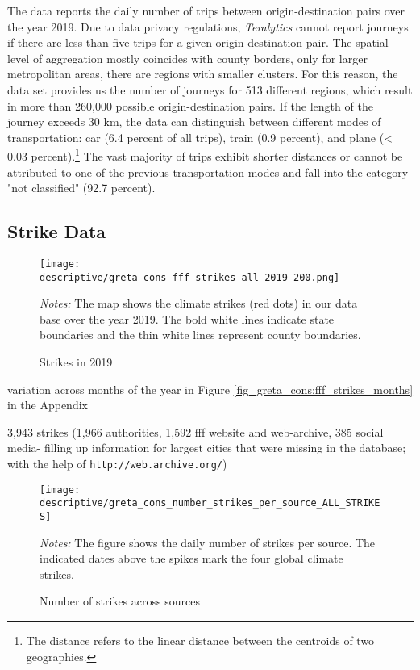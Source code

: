The data reports the daily number of trips between origin-destination pairs over the year 2019. Due to data privacy regulations, \textit{Teralytics} cannot report journeys if there are less than five trips for a given origin-destination pair. The spatial level of aggregation mostly coincides with county borders, only for larger metropolitan areas, there are regions with smaller clusters. For this reason, the data set provides us the number of journeys for 513 different regions, which result in more than 260,000 possible origin-destination pairs. If the length of the journey exceeds 30 km, the data can distinguish between different modes of transportation: car (6.4 percent of all trips), train (0.9 percent), and plane (< 0.03 percent).\footnote{The distance refers to the linear distance between the centroids of two geographies.} The vast majority of trips exhibit shorter distances or cannot be attributed to one of the previous transportation modes and fall into the category "not classified" (92.7 percent).








\subsection{Strike Data}


\begin{figure}[t]\centering
	\caption{Strikes in 2019}\label{fig_greta_cons:fff_strikes_2019}
	\texttt{[image: descriptive/greta\_cons\_fff\_strikes\_all\_2019\_200.png]}
	\begin{minipage}{0.8\linewidth}
		\scriptsize{\emph{Notes:} The map shows the climate strikes (red dots) in our data base over the year 2019. The bold white lines indicate state boundaries and the thin white lines represent county boundaries.}
	\end{minipage}
\end{figure}

variation across months of the year in Figure \ref{fig_greta_cons:fff_strikes_months} in the Appendix


3,943 strikes (1,966 authorities, 1,592 fff website and web-archive, 385 social media- filling up information for largest cities that were missing in the database; with the help of \texttt{http://web.archive.org/})

\begin{figure}[t]\centering
	\caption{Number of strikes across sources}\label{fig_greta_cons:number_strikes_per_source}
	\texttt{[image: descriptive/greta\_cons\_number\_strikes\_per\_source\_ALL\_STRIKES]}
	\begin{minipage}{0.8\linewidth}
		\scriptsize{\emph{Notes:} The figure shows the daily number of strikes per source. The indicated dates above the spikes mark the four global climate strikes.}
	\end{minipage}
\end{figure}



